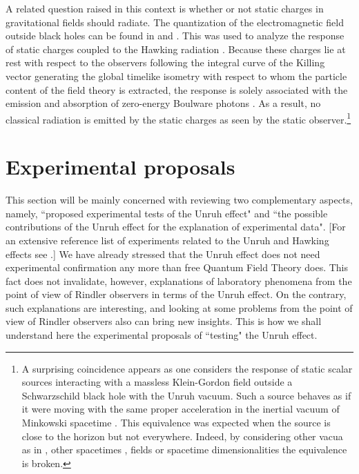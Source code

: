 \documentclass[12pt,nofootinbib,floatfix,aps,prd,showpacs,amsmath,amssymb,eqsecnum]{revtex4-2}
\let\cite\citep
\begin{document}
A related question raised in this context is whether or not static
charges in gravitational fields should radiate. The quantization of the 
electromagnetic field outside black holes can be found 
in \textcite{Cognolaetal98} and \textcite{Crispinoetal01}. This was used to analyze 
the response of static charges coupled to the Hawking radiation
\cite{Crispinoetal98}. Because these charges lie at rest with respect
to the observers following the integral curve of the Killing vector
generating the global timelike isometry with 
respect to whom the particle content of the field theory is extracted,
the response is solely associated with the emission and absorption 
of zero-energy Boulware photons \cite{Boulware75,Boulware75b}. 
As a result, no classical radiation is emitted by the static 
charges as seen by the static observer\cite{Eriksenetal04}.\footnote{ 
A surprising coincidence appears as one considers the response of
static scalar sources interacting with a massless Klein-Gordon field 
outside a Schwarzschild black hole with the Unruh vacuum. Such a source 
behaves as if it were moving with the same proper acceleration in the 
inertial vacuum of Minkowski spacetime \cite{Higuchietal97}. 
This equivalence was expected when the source is close to the 
horizon \cite{Grishchuketal87} but not everywhere. Indeed, by considering 
other vacua \cite{Higuchietal98} as in \textcite{Hartleetal76}, 
other spacetimes \cite{Castineirasetal00}, fields 
\cite{Crispinoetal98,Castineirasetal03} 
or spacetime dimensionalities \cite{Crispinoetal04} 
the equivalence is broken.
                                      }

\section{Experimental proposals}
\label{section:Experimentalproposals}

This section will be mainly concerned with reviewing two complementary aspects, namely,
``proposed experimental tests of the Unruh effect" and ``the possible contributions of 
the Unruh effect for the explanation of experimental data". 
[For an extensive reference 
list of experiments related to the Unruh and Hawking effects 
see \textcite{Rosu01}.] 
We have already stressed that the Unruh effect 
does not need experimental confirmation 
any more than free Quantum Field Theory does. This fact 
does not invalidate, however, 
explanations of laboratory phenomena from the point of view of Rindler observers in 
terms of the Unruh effect. On the contrary, such explanations are 
interesting, and looking at 
some problems from the point of view of Rindler observers also 
can bring new insights.
This is how we shall understand here the experimental proposals of ``testing" the 
Unruh effect.
\end{document}

